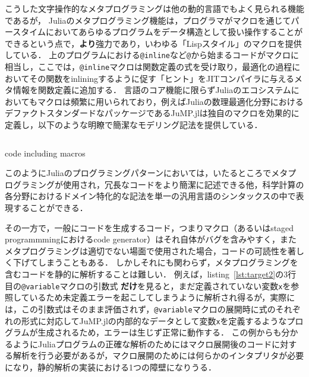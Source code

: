こうした文字操作的なメタプログラミングは他の動的言語でもよく見られる機能であるが，
Juliaのメタプログラミング機能は，プログラマがマクロを通じてパースタイムにおいてあらゆるプログラムをデータ構造として扱い操作することができるという点で，\textbf{より}強力であり，いわゆる「Lispスタイル」のマクロを提供している．
上のプログラムにおける\verb|@inline|など\verb|@|から始まるコードがマクロに相当し，ここでは，\verb|@inline|マクロは関数定義の式を受け取り，最適化の過程においてその関数をinliningするように促す「ヒント」をJITコンパイラに与えるメタ情報を関数定義に追加する．
言語のコア機能に限らずJuliaのエコシステムにおいてもマクロは頻繁に用いられており，例えばJuliaの数理最適化分野におけるデファクトスタンダードなパッケージであるJuMP.jl\cite{DunningHuchetteLubin2017}は独自のマクロを効果的に定義し，以下のような明瞭で簡潔なモデリング記法を提供している．

\begin{listing}[ht]
  \inputminted[frame=lines, linenos, firstnumber=1, firstline=4, lastline=10]{julia}{src/jump.jl}
  \caption{code including macros}
  \label{lst:target2}
\end{listing}

このようにJuliaのプログラミングパターンにおいては，いたるところでメタプログラミングが使用され\footnotemark，冗長なコードをより簡潔に記述できる他，科学計算の各分野におけるドメイン特化的な記法を単一の汎用言語のシンタックスの中で表現することができる\cite{jeff-phd}．


その一方で，一般にコードを生成するコード，つまりマクロ（あるいはstaged programmmingにおけるcode generator）はそれ自体がバグを含みやすく，またメタプログラミングは適切でない場面で使用された場合，コードの可読性を著しく下げてしまうこともある．
しかしそれにも関わらず，メタプログラミングを含むコードを静的に解析することは難しい．
例えば，listing~\ref{lst:target2}の3行目の\verb|@variable|マクロの引数式  \textbf{だけ}を見ると，まだ定義されていない変数\verb|x|を参照しているため未定義エラーを起こしてしまうように解析され得るが，実際には，この引数式はそのまま評価されず，\verb|@variable|マクロの展開時に式のそれぞれの形式に対応してJuMP.jlの内部的なデータとして変数\verb|x|を定義するようなプログラムが生成されるため，エラーは生じず正常に動作する．
この例からも分かるようにJuliaプログラムの正確な解析のためにはマクロ展開後のコードに対する解析を行う必要があるが，マクロ展開のためには何らかのインタプリタが必要になり，静的解析の実装における1つの障壁になりうる．\footnotemark

